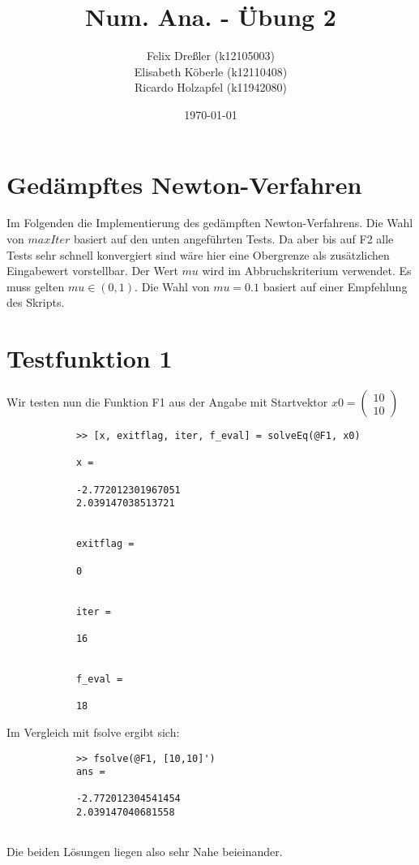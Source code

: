 \documentclass[11pt,titlepage]{article}
\title{Num. Ana. - Übung 2}
\author{Felix Dreßler (k12105003) \\ Elisabeth Köberle (k12110408) \\ Ricardo Holzapfel (k11942080)}
\date{\today} %
\begin{document}
\maketitle
	
	\section{Gedämpftes Newton-Verfahren}
		Im Folgenden die Implementierung des gedämpften Newton-Verfahrens. Die Wahl von $maxIter$ basiert auf den unten angeführten Tests. Da aber bis auf F2 alle Tests sehr schnell konvergiert sind wäre hier eine Obergrenze als zusätzlichen Eingabewert vorstellbar.
		Der Wert $mu$ wird im Abbruchskriterium verwendet. Es muss gelten $mu \in (0,1)$. Die Wahl von $ mu = 0.1$ basiert auf einer Empfehlung des Skripts.
	
		


\newpage
	\section{Testfunktion 1}
		Wir testen nun die Funktion F1 aus der Angabe mit Startvektor $ x0 = \begin{pmatrix} 10 \\ 10\end{pmatrix} $
		
		\begin{lstlisting}
			>> [x, exitflag, iter, f_eval] = solveEq(@F1, x0)
			
			x =
			
			-2.772012301967051
			2.039147038513721
			
			
			exitflag =
			
			0
			
			
			iter =
			
			16
			
			
			f_eval =
			
			18
		\end{lstlisting}
	
		Im Vergleich mit fsolve ergibt sich:
		
		\begin{lstlisting}
			>> fsolve(@F1, [10,10]')
			ans =
			
			-2.772012304541454
			2.039147040681558
			
		\end{lstlisting}
		
		Die beiden Lösungen liegen also sehr Nahe beieinander.
		
\end{document}

